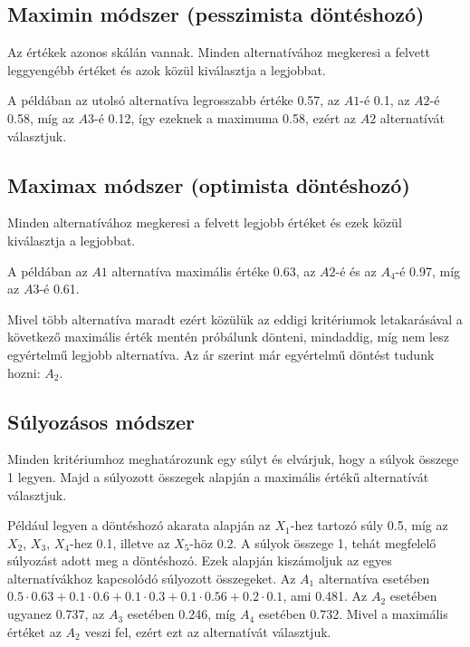 \documentclass[a4paper,12pt]{article}
\begin{document}
\subsection{Maximin módszer (pesszimista döntéshozó)}

Az értékek azonos skálán vannak. Minden alternatívához megkeresi a felvett leggyengébb értéket és azok közül kiválasztja a legjobbat.

A példában az utolsó alternatíva legrosszabb értéke 0.57, az $A1$-é 0.1, az $A2$-é 0.58, míg az $A3$-é 0.12, így ezeknek a maximuma 0.58, ezért az $A2$ alternatívát választjuk.

\subsection{Maximax módszer (optimista döntéshozó)}

Minden alternatívához megkeresi a felvett legjobb értéket és ezek közül kiválasztja a legjobbat.

A példában az $A1$ alternatíva maximális értéke 0.63, az $A2$-é és az  $A_4$-é  0.97, míg az $A3$-é 0.61.

Mivel több alternatíva maradt ezért közülük az eddigi kritériumok letakarásával a következő maximális érték mentén próbálunk dönteni,
mindaddig, míg nem lesz egyértelmű legjobb alternatíva. Az ár szerint már egyértelmű döntést tudunk hozni: $A_2$.


\subsection{Súlyozásos módszer}

Minden kritériumhoz meghatározunk egy súlyt és elvárjuk, hogy a súlyok összege 1 legyen.
Majd a súlyozott összegek alapján a maximális értékű alternatívát választjuk.

Például legyen a döntéshozó akarata alapján az $X_1$-hez tartozó súly 0.5, míg az $X_2$, $X_3$, $X_4$-hez 0.1, illetve az $X_5$-höz 0.2.
A súlyok összege 1, tehát megfelelő súlyozást adott meg a döntéshozó.
Ezek alapján kiszámoljuk az egyes alternatívákhoz kapcsolódó súlyozott összegeket.
Az $A_1$ alternatíva esetében $0.5\cdot0.63+0.1\cdot0.6+0.1\cdot0.3+0.1\cdot0.56+0.2\cdot0.1$, ami 0.481.
Az $A_2$ esetében ugyanez 0.737,
az $A_3$ esetében 0.246, %
míg $A_4$ esetében 0.732. %
Mivel a maximális értéket az $A_2$ veszi fel, ezért ezt az alternatívát választjuk.
\end{document}
